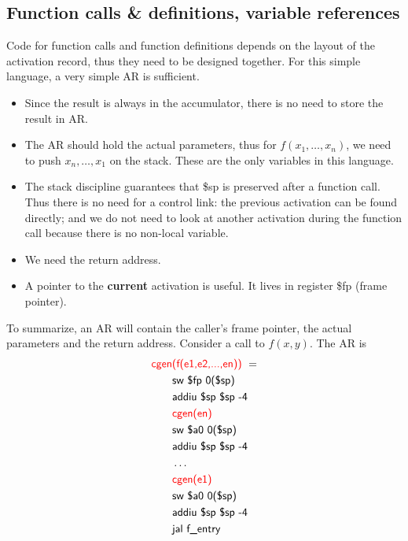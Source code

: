 \subsection{Function calls \& definitions, variable references}
Code for function calls and function definitions depends on the layout of the activation record, thus they need to be designed together. For this simple language, a very simple AR is sufficient. 
\begin{itemize}
\item Since the result is always in the accumulator, there is no need to store the result in AR. 
\item The AR should hold the actual parameters, thus for $f(x_1,\dots,x_n)$, we need to push $x_n,\dots,x_1$ on the stack. These are the only variables in this language. 
\item The stack discipline guarantees that \$sp is preserved after a function call. Thus there is no need for a control link: the previous activation can be found directly; and we do not need to look at another activation during the function call because there is no non-local variable. 
\item We need the return address.
\item A pointer to the \textbf{current} activation is useful. It lives in register \$fp (frame pointer).
\end{itemize}
To summarize, an AR will contain the caller's frame pointer, the actual parameters and the return address. Consider a call to $f(x,y)$. The AR is 
\begin{equation*}\begin{split}
\textsf{\color{red}cgen}&\textsf{\color{red}(f(e1,e2,...,en)) }=\\
&\textsf{sw \$fp 0(\$sp)}\\
&\textsf{addiu \$sp \$sp -4}\\
&\textsf{\color{red}cgen(en)}\\
&\textsf{sw \$a0 0(\$sp)}\\
&\textsf{addiu \$sp \$sp -4}\\
&\dots\\
&\textsf{\color{red}cgen(e1)}\\
&\textsf{sw \$a0 0(\$sp)}\\
&\textsf{addiu \$sp \$sp -4}\\
&\textsf{jal f\_entry}
\end{split}\end{equation*}

